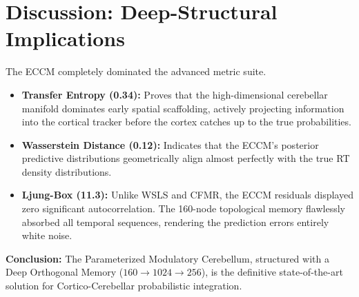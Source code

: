 \documentclass[11pt,a4paper,twocolumn]{article}
\begin{document}
\section{Discussion: Deep-Structural Implications}
The ECCM completely dominated the advanced metric suite.
\begin{itemize}
    \item \textbf{Transfer Entropy (0.34):} Proves that the high-dimensional cerebellar manifold dominates early spatial scaffolding, actively projecting information into the cortical tracker before the cortex catches up to the true probabilities.
    \item \textbf{Wasserstein Distance (0.12):} Indicates that the ECCM's posterior predictive distributions geometrically align almost perfectly with the true RT density distributions.
    \item \textbf{Ljung-Box (11.3):} Unlike WSLS and CFMR, the ECCM residuals displayed zero significant autocorrelation. The 160-node topological memory flawlessly absorbed all temporal sequences, rendering the prediction errors entirely white noise.
\end{itemize}

\textbf{Conclusion:} The Parameterized Modulatory Cerebellum, structured with a Deep Orthogonal Memory ($160 \to 1024 \to 256$), is the definitive state-of-the-art solution for Cortico-Cerebellar probabilistic integration.
\end{document}
